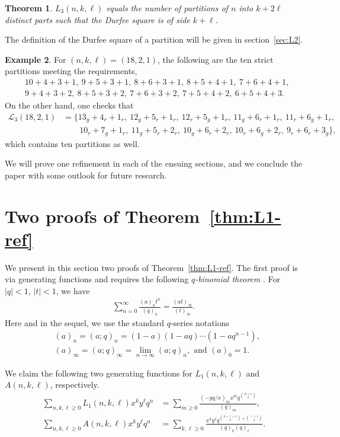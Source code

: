 \documentclass[11pt,reqno]{amsart}
\numberwithin{equation}{section}
\theoremstyle{plain}
\newtheorem{theorem}{Theorem}[section]
\theoremstyle{definition}
\newtheorem{example}[theorem]{Example}
\renewcommand{\L}{\mathcal{L}}
\begin{document}
\begin{theorem}\label{thm:L3-ref}
$L_3(n,k,\ell)$ equals the number of partitions of $n$ into $k+2\ell$ distinct parts such that the Durfee square is of side $k+\ell$.
\end{theorem}

The definition of the Durfee square of a partition will be given in section~\ref{sec:L2}.
\begin{example}
For $(n,k,\ell)=(18,2,1)$, the following are the ten strict partitions meeting the requirements,
\begin{align*}
& 10+4+3+1,~9+5+3+1,~8+6+3+1,~8+5+4+1,~7+6+4+1, \\
& 9+4+3+2,~8+5+3+2,~7+6+3+2,~7+5+4+2,~6+5+4+3.
\end{align*}
On the other hand, one checks that
\begin{align*}
\L_3(18,2,1) &= \{13_g+4_r+1_r,~12_g+5_r+1_r,~12_r+5_g+1_r,~11_g+6_r+1_r,~11_r+6_g+1_r,\\
&\qquad 10_r+7_g+1_r,~11_g+5_r+2_r,~10_g+6_r+2_r,~10_r+6_g+2_r,~9_r+6_r+3_g\},
\end{align*}
which contains ten partitions as well.
\end{example}

We will prove one refinement in each of the ensuing sections, and we conclude the paper with some outlook for future research.

\section{Two proofs of Theorem~\ref{thm:L1-ref}}\label{sec:L1}

We present in this section two proofs of Theorem~\ref{thm:L1-ref}. The first proof is via generating functions and requires the following {\it $q$-binomial theorem} \cite[p.~17,~Thm.~2.1]{andtp}. For $|q|<1$, $|t|<1$, we have
\begin{align}\label{id:q-bin}
\sum_{n=0}^{\infty}\frac{(a)_nt^n}{(q)_n}=\frac{(at)_{\infty}}{(t)_{\infty}}.
\end{align}
Here and in the sequel, we use the standard $q$-series notations
\begin{align*}
&(a)_n =(a;q)_n =(1-a)(1-aq)\cdots(1-aq^{n-1}),\\
&(a)_{\infty} =(a;q)_{\infty} =\lim_{n\to \infty}(a;q)_{n},\text{ and } (a)_0 =1.
\end{align*}

We claim the following two generating functions for $L_1(n,k,\ell)$ and $A(n,k,\ell)$, respectively.
\begin{align}
\label{id:gfL1}
\sum_{n,k,\ell\ge 0}L_1(n,k,\ell)x^ky^{\ell}q^n &= \sum_{m\ge 0}\frac{(-yq/x)_m x^m q^{\binom{m+1}{2}}}{(q)_m},\\
\label{id:gfA}
\sum_{n,k,\ell\ge 0}A(n,k,\ell)x^ky^{\ell}q^n &= \sum_{k,\ell\ge 0}\frac{x^k y^{\ell}q^{\binom{k+\ell+1}{2}+\binom{\ell+1}{2}}}{(q)_k(q)_{\ell}}.
\end{align}
\end{document}
